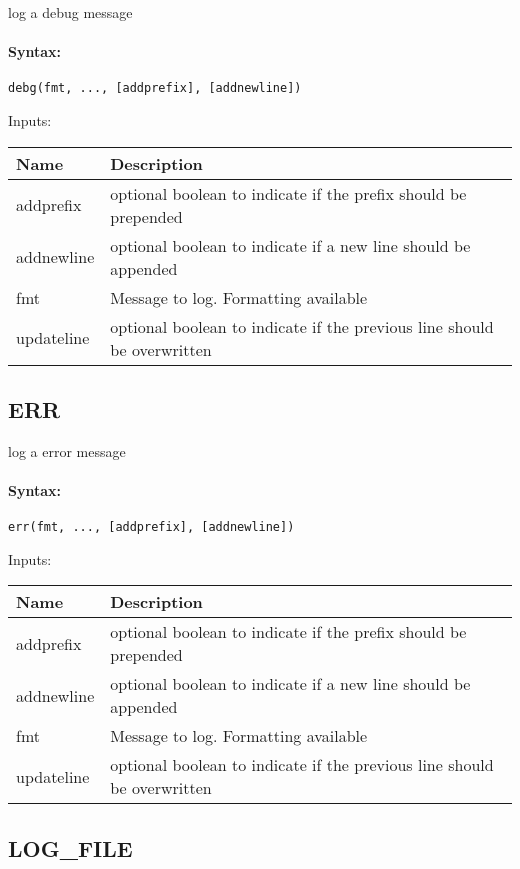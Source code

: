 log a debug message

\paragraph{Syntax:} \verb|debg(fmt, ..., [addprefix], [addnewline])|

\bigskip
Inputs:

\begin{tabular}{|p{}|p{}|}
\hline
\textbf{Name} & \textbf{Description} \\
\hline \hline
addprefix & optional boolean to indicate if the prefix should be prepended  \\ \hline
addnewline & optional boolean to indicate if a new line should be appended  \\ \hline
fmt & Message to log. Formatting available  \\ \hline
updateline & optional boolean to indicate if the previous line should be overwritten  \\ \hline
\end{tabular}


\subsection{ERR}

log a error message

\paragraph{Syntax:} \verb|err(fmt, ..., [addprefix], [addnewline])|

\bigskip
Inputs:

\begin{tabular}{|p{}|p{}|}
\hline
\textbf{Name} & \textbf{Description} \\
\hline \hline
addprefix & optional boolean to indicate if the prefix should be prepended  \\ \hline
addnewline & optional boolean to indicate if a new line should be appended  \\ \hline
fmt & Message to log. Formatting available  \\ \hline
updateline & optional boolean to indicate if the previous line should be overwritten  \\ \hline
\end{tabular}


\subsection{LOG\_FILE}

